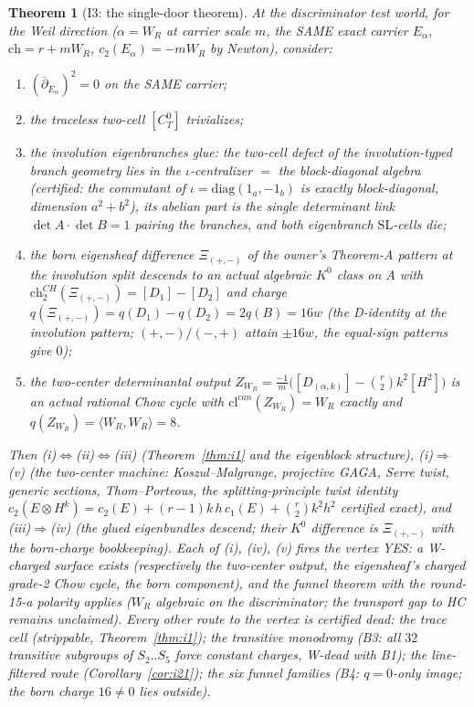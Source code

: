 \documentclass[11pt]{article}
\newtheorem{theorem}{Theorem}
\begin{document}
\begin{theorem}[I3: the single-door theorem]\label{thm:i3}
At the discriminator test world, for the Weil direction ($\alpha=W_R$ at carrier scale
$m$, the SAME exact carrier $E_\alpha$, $\mathrm{ch}=r+mW_R$, $c_2(E_\alpha)=-mW_R$ by
Newton), consider:
\begin{enumerate}
\item[(i)] $(\bar\partial_{E_\alpha})^2=0$ on the SAME carrier;
\item[(ii)] the traceless two-cell $[C_T^0]$ trivializes;
\item[(iii)] the involution eigenbranches glue: the two-cell defect of the
involution-typed branch geometry lies in the $\iota$-centralizer $=$ the block-diagonal
algebra (certified: the commutant of $\iota=\mathrm{diag}(1_a,-1_b)$ is exactly
block-diagonal, dimension $a^2+b^2$), its abelian part is the single determinant link
$\det A\cdot\det B=1$ pairing the branches, and both eigenbranch $\mathrm{SL}$-cells
die;
\item[(iv)] the born eigensheaf difference $\Xi_{(+,-)}$ of the owner's Theorem-A
pattern at the involution split descends to an actual algebraic $K^0$ class on $A$ with
$\mathrm{ch}^{CH}_2(\Xi_{(+,-)})=[D_1]-[D_2]$ and charge
$q(\Xi_{(+,-)})=q(D_1)-q(D_2)=2q(B)=16w$ (the D-identity at the involution pattern;
$(+,-)/(-,+)$ attain $\pm16w$, the equal-sign patterns give $0$);
\item[(v)] the two-center determinantal output
$Z_{W_R}=\frac{-1}{m}\bigl([D_{(\alpha,k)}]-\binom r2k^2[H^2]\bigr)$ is an actual
rational Chow cycle with $\mathrm{cl}^{can}(Z_{W_R})=W_R$ exactly and
$q(Z_{W_R})=\langle W_R,W_R\rangle=8$.
\end{enumerate}
Then (i)$\iff$(ii)$\iff$(iii) (Theorem~\ref{thm:i1} and the eigenblock structure),
(i)$\Rightarrow$(v) (the two-center machine: Koszul--Malgrange, projective GAGA, Serre
twist, generic sections, Thom--Porteous, the splitting-principle twist identity
$c_2(E\otimes H^k)=c_2(E)+(r-1)k\,h\,c_1(E)+\binom r2k^2h^2$ certified exact), and
(iii)$\Rightarrow$(iv) (the glued eigenbundles descend; their $K^0$ difference is
$\Xi_{(+,-)}$ with the born-charge bookkeeping). Each of (i), (iv), (v) fires the
vertex YES: a W-charged surface exists (respectively the two-center output, the
eigensheaf's charged grade-2 Chow cycle, the born component), and the funnel theorem
with the round-15-a polarity applies ($W_R$ algebraic on the discriminator; the
transport gap to HC remains unclaimed).
Every other route to the vertex is certified dead: the trace cell (strippable,
Theorem~\ref{thm:i1}); the transitive monodromy (B3: all $32$ transitive subgroups of
$S_2..S_5$ force constant charges, W-dead with B1); the line-filtered route
(Corollary~\ref{cor:i21}); the six funnel families (B4: $q=0$-only image; the born
charge $16\ne0$ lies outside).
\end{theorem}
\end{document}
